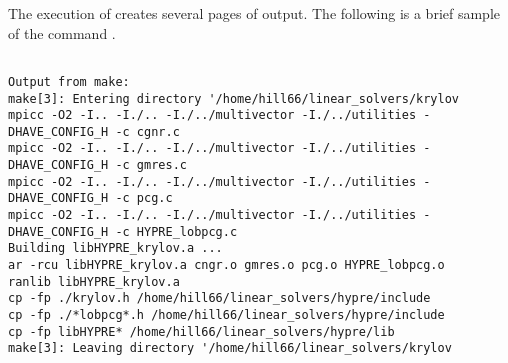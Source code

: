 The execution of  creates several pages of output.  The following is a brief 
sample of the command .
\begin{verbatim}

Output from make:
make[3]: Entering directory '/home/hill66/linear_solvers/krylov
mpicc -O2 -I.. -I./.. -I./../multivector -I./../utilities -DHAVE_CONFIG_H -c cgnr.c
mpicc -O2 -I.. -I./.. -I./../multivector -I./../utilities -DHAVE_CONFIG_H -c gmres.c
mpicc -O2 -I.. -I./.. -I./../multivector -I./../utilities -DHAVE_CONFIG_H -c pcg.c
mpicc -O2 -I.. -I./.. -I./../multivector -I./../utilities -DHAVE_CONFIG_H -c HYPRE_lobpcg.c
Building libHYPRE_krylov.a ...
ar -rcu libHYPRE_krylov.a cngr.o gmres.o pcg.o HYPRE_lobpcg.o
ranlib libHYPRE_krylov.a
cp -fp ./krylov.h /home/hill66/linear_solvers/hypre/include
cp -fp ./*lobpcg*.h /home/hill66/linear_solvers/hypre/include
cp -fp libHYPRE* /home/hill66/linear_solvers/hypre/lib
make[3]: Leaving directory '/home/hill66/linear_solvers/krylov

\end{verbatim}
